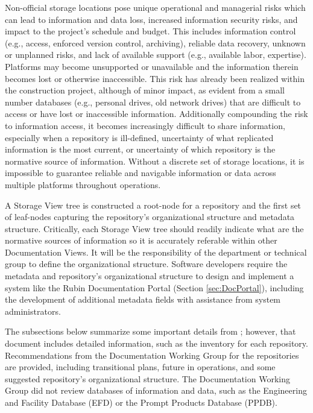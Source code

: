 Non-official storage locations pose unique operational and managerial risks which can lead to information and data loss, increased information security risks, and impact to the project's schedule and budget.
This includes information control (e.g., access, enforced version control, archiving), reliable data recovery, unknown or unplanned risks, and lack of available support (e.g., available labor, expertise).
Platforms may become unsupported or unavailable and the information therein becomes lost or otherwise inaccessible.
This risk has already been realized within the construction project, although of minor impact, as evident from a small number databases (e.g., personal drives, old network drives) that are difficult to access or have lost or inaccessible information. 
Additionally compounding the risk to information access, it becomes increasingly difficult to share information, especially when a repository is ill-defined, uncertainty of what replicated information is the most current, or uncertainty of which repository is the normative source of information.
Without a discrete set of storage locations, it is impossible to guarantee reliable and navigable information or data across multiple platforms throughout operations.

A Storage View tree is constructed a root-node for a repository and the first set of leaf-nodes capturing the repository's organizational structure and metadata structure.
Critically, each Storage View tree should readily indicate what are the normative sources of information so it is accurately referable within other Documentation Views.
It will be the responsibility of the department or technical group to define the organizational structure.
Software developers require the metadata and repository's organizational structure to design and implement a system like the Rubin Documentation Portal (Section \ref{sec:DocPortal}), including the development of additional metadata fields with assistance from system administrators.

The subsections below summarize some important details from ; however, that document includes detailed information, such as the inventory for each repository.
Recommendations from the Documentation Working Group for the repositories are provided, including transitional plans, future in operations, and some suggested repository's organizational structure.
The Documentation Working Group did not review databases of information and data, such as the Engineering and Facility Database (EFD) or the Prompt Products Database (PPDB).

